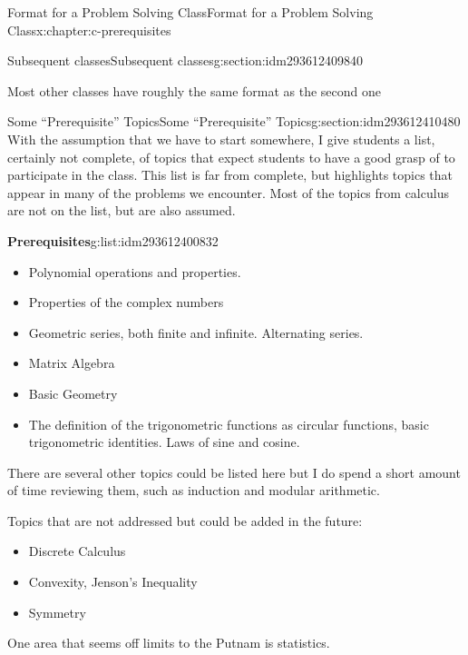 \documentclass[twoside,10pt,]{book}
\numberwithin{equation}{section}
\begin{document}
\begin{chapterptx}{Format for a Problem Solving Class}{}{Format for a Problem Solving Class}{}{}{x:chapter:c-prerequisites}
\begin{sectionptx}{Subsequent classes}{}{Subsequent classes}{}{}{g:section:idm293612409840}
\par
Most other classes have roughly the same format as the second one%
\end{sectionptx}
%
%
\typeout{************************************************}
\typeout{************************************************}
%
\begin{sectionptx}{Some ``Prerequisite'' Topics}{}{Some ``Prerequisite'' Topics}{}{}{g:section:idm293612410480}
With the assumption that we have to start somewhere, I give students a list, certainly not complete, of topics that expect students to have a good grasp of to participate in the class.  This list is far from complete, but highlights topics that appear in many of the problems we encounter. Most of the topics from calculus are not on the list, but are also assumed.%
\begin{listptx}{\textbf{Prerequisites}}{g:list:idm293612400832}{}%
%
\begin{itemize}[label=\textbullet]
\item{}Polynomial operations and properties.%
\item{}Properties of the complex numbers%
\item{}Geometric series, both finite and infinite.  Alternating series.%
\item{}Matrix Algebra%
\item{}Basic Geometry%
\item{}The definition of the trigonometric functions as circular functions, basic trigonometric identities.  Laws of sine and cosine.%
\end{itemize}
There are several other topics could be listed here but I do spend a short amount of time reviewing them, such as induction and modular arithmetic.%
\par
Topics that are not addressed but could be added in the future:%
\begin{itemize}[label=\textbullet]
\item{}Discrete Calculus%
\item{}Convexity, Jenson's Inequality%
\item{}Symmetry%
\end{itemize}
One area that seems off limits to the Putnam is statistics.%
\end{listptx}%
\end{sectionptx}
\end{chapterptx}
%
%
\typeout{************************************************}
\end{document}
